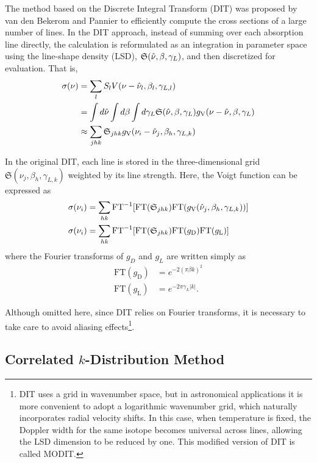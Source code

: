The method based on the Discrete Integral Transform (DIT) was proposed by van den Bekerom and Pannier \cite{van2021discrete} to efficiently compute the cross sections of a large number of lines.  
In the DIT approach, instead of summing over each absorption line directly, the calculation is reformulated as an integration in parameter space using the line-shape density (LSD), $\mathfrak{S}(\hat{\nu},\beta,\gamma_L)$, and then discretized for evaluation. That is,
\begin{align}
\sigma (\nu) &= \sum_l S_l V(\nu - \hat{\nu}_l, \beta_l, \gamma_{L,l}) \\
&= \int d \hat{\nu} \int d \beta \int d \gamma_L  \mathfrak{S}(\hat{\nu},\beta,\gamma_L) g_\mathrm{V}(\nu - \hat{\nu}, \beta, \gamma_{L})\\
&\approx \sum_{jhk} \mathfrak{S}_{jhk} g_\mathrm{V}(\nu_i - \hat{\nu}_j, \beta_h, \gamma_{L,k}) 
\label{eq:FTFT}
\end{align}

In the original DIT, each line is stored in the three-dimensional grid 
$\mathfrak{S} (\nu_j, \beta_h,\gamma_{L,k})$ weighted by its line strength.  
Here, the Voigt function can be expressed as
\begin{align}
\sigma (\nu_i) &= \sum_{hk} \mathrm{FT}^{-1} [ \mathrm{FT} (\mathfrak{S}_{jhk})  \mathrm{FT} (g_\mathrm{V} (\hat{\nu}_j, \beta_h, \gamma_{L,k})) ] \\
\sigma (\nu_i) &= \sum_{hk} \mathrm{FT}^{-1} [ \mathrm{FT} (\mathfrak{S}_{jhk})  \mathrm{FT} (g_\mathrm{D} ) \mathrm{FT} (g_\mathrm{L})] 
\end{align}
where the Fourier transforms of $g_D$ and $g_L$ are written simply as
\begin{align}
\mathrm{FT} (g_\mathrm{D} ) &= e^{-2 (\pi \beta k)^2 }\\
\mathrm{FT} (g_\mathrm{L})  &= e^{-2 \pi \gamma_L |k| }.
\end{align}

Although omitted here, since DIT relies on Fourier transforms, it is necessary to take care to avoid aliasing effects\footnote{DIT uses a grid in wavenumber space, but in astronomical applications it is more convenient to adopt a logarithmic wavenumber grid, which naturally incorporates radial velocity shifts. In this case, when temperature is fixed, the Doppler width for the same isotope becomes universal across lines, allowing the LSD dimension to be reduced by one. This modified version of DIT is called MODIT.}.

\subsection*{Correlated $k$-Distribution Method}

